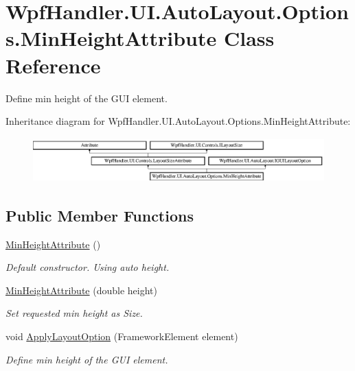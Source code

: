 \hypertarget{class_wpf_handler_1_1_u_i_1_1_auto_layout_1_1_options_1_1_min_height_attribute}{}\section{Wpf\+Handler.\+U\+I.\+Auto\+Layout.\+Options.\+Min\+Height\+Attribute Class Reference}
\label{class_wpf_handler_1_1_u_i_1_1_auto_layout_1_1_options_1_1_min_height_attribute}


Define min height of the G\+UI element.  


Inheritance diagram for Wpf\+Handler.\+U\+I.\+Auto\+Layout.\+Options.\+Min\+Height\+Attribute\+:\begin{figure}[H]
\begin{center}
\leavevmode
\includegraphics[height=1.723077cm]{d7/dff/class_wpf_handler_1_1_u_i_1_1_auto_layout_1_1_options_1_1_min_height_attribute}
\end{center}
\end{figure}
\subsection*{Public Member Functions}
\begin{DoxyCompactItemize}
\item 
\mbox{\hyperlink{class_wpf_handler_1_1_u_i_1_1_auto_layout_1_1_options_1_1_min_height_attribute_ad263ee4e1ae14222051889791d35c95e}{Min\+Height\+Attribute}} ()
\begin{DoxyCompactList}\small\item\em Default constructor. Using auto height. \end{DoxyCompactList}\item 
\mbox{\hyperlink{class_wpf_handler_1_1_u_i_1_1_auto_layout_1_1_options_1_1_min_height_attribute_a4c3ec69b8c292501be942bf6d89b5927}{Min\+Height\+Attribute}} (double height)
\begin{DoxyCompactList}\small\item\em Set requested min height as Size. \end{DoxyCompactList}\item 
void \mbox{\hyperlink{class_wpf_handler_1_1_u_i_1_1_auto_layout_1_1_options_1_1_min_height_attribute_a8c049220211484fea64fbd1589a4cc57}{Apply\+Layout\+Option}} (Framework\+Element element)
\begin{DoxyCompactList}\small\item\em Define min height of the G\+UI element. \end{DoxyCompactList}\end{DoxyCompactItemize}
